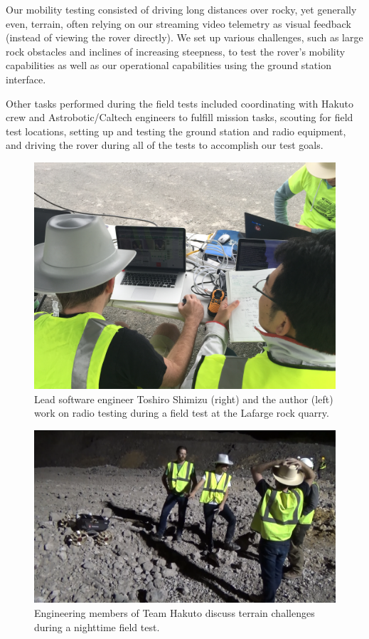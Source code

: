 Our mobility testing consisted of driving long distances over rocky, yet generally even, terrain, often relying on our streaming video telemetry as visual feedback (instead of viewing the rover directly). We set up various challenges, such as large rock obstacles and inclines of increasing steepness, to test the rover's mobility capabilities as well as our operational capabilities using the ground station interface.

Other tasks performed during the field tests included coordinating with Hakuto crew and Astrobotic/Caltech engineers to fulfill mission tasks, scouting for field test locations, setting up and testing the ground station and radio equipment, and driving the rover during all of the tests to accomplish our test goals.

\begin{figure}[h]
\centering
    \includegraphics[width=\columnwidth]{images/daytime_operation_pittsburgh_field_test.jpg}
    \caption{Lead software engineer Toshiro Shimizu (right) and the author (left) work on radio testing during a field test at the Lafarge rock quarry.}
    \label{fig:daytime_operation_pittsburgh_field_test}
\end{figure}

\begin{figure}[h]
\centering
    \includegraphics[width=\columnwidth]{images/night_test_team.png}
    \caption{Engineering members of Team Hakuto discuss terrain challenges during a nighttime field test.}
    \label{fig:night_test_team}
\end{figure}

